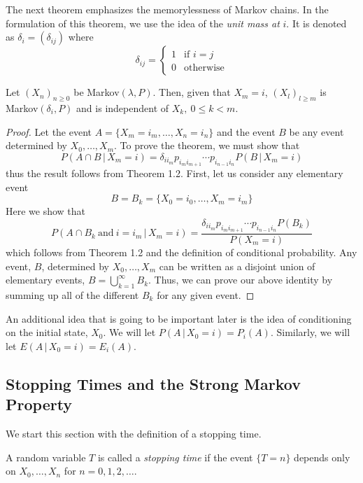 The next theorem emphasizes the memorylessness of Markov chains. In the formulation of this theorem, we use the idea of the \emph{unit mass at} $i$. It is denoted as $\delta_i = (\delta_{ij})$ where
\[\delta_{ij} = \left\{ \begin{array}{ll}
1 & \textrm{if $i=j$}\\
0 & \textrm{otherwise}
\end{array} \right. \]

\begin{thm} Let $(X_n)_{n \geq 0}$ be Markov$(\lambda,P)$. Then, given that $X_m = i$, $(X_l)_{l \geq m}$ is Markov$(\delta_i,P)$ and is independent of $X_k, \: 0 \leq k < m$.
\end{thm}
\begin{proof} Let the event $A=\{X_m=i_m, \ldots, X_n=i_n\}$ and the event $B$ be any event determined by $X_0, \ldots, X_m$. To prove the theorem, we must show that
\[P(A \cap B \, | \, X_m=i) = \delta_{ii_m}p_{i_mi_{m+1}}\cdots p_{i_{n-1}i_n}P(B\, | \, X_m=i)\]
 thus the result follows from Theorem 1.2. First, let us consider any elementary event
\[ B=B_k=\{X_0=i_0, \ldots, X_m=i_m\}\]
Here we show that
\[ P(A \cap B_k \: \textrm{and} \: i=i_m \,|\, X_m=i) = \frac{\delta_{ii_m}p_{i_mi_{m+1}}\cdots p_{i_{n-1}i_n}P(B_k)}{P(X_m=i)}\]
which follows from Theorem 1.2 and the definition of conditional probability. Any event, $B$, determined by $X_0, \ldots, X_m$ can be written as a disjoint union of elementary events, $B=\bigcup_{k=1}^{\infty} B_k$. Thus, we can prove our above identity by summing up all of the different $B_k$ for any given event.
\end{proof}

An additional idea that is going to be important later is the idea of conditioning on the initial state, $X_0$. We will let $P(A\,|\,X_0=i) = P_i(A)$. Similarly, we will let $E(A\,|\,X_0=i)=E_i(A)$.

\subsection{Stopping Times and the Strong Markov Property}

We start this section with the definition of a stopping time.
\begin{defn} A random variable $T$ is called a \emph{stopping time} if the event $\{T=n\}$ depends only on $X_0, \ldots, X_n$ for $n=0,1,2,\ldots$.
\end{defn}

